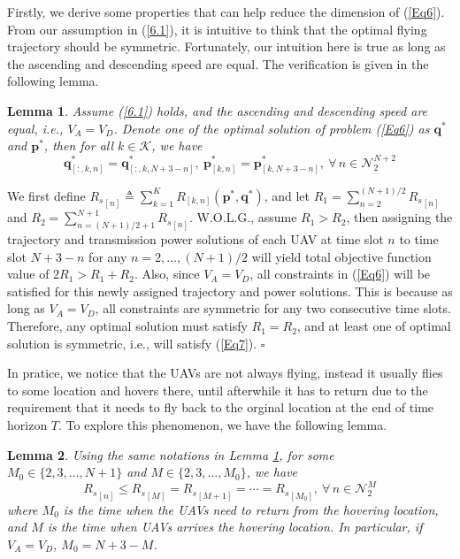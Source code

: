 \documentclass[10pt,final,conference]{IEEEtran}
\newtheorem{lemma}{\textbf{Lemma}}
\renewenvironment{proof}{{\noindent\it Proof.}\quad}{\hfill $\square$\par}
\begin{document}
Firstly, we derive some properties that can help reduce the dimension of (\ref{Eq6}). From our assumption in (\ref{6.1}), it is intuitive to think that the optimal flying trajectory should be symmetric. Fortunately, our intuition here is true as long as the ascending and descending speed are equal. The verification is given in the following lemma.
\begin{lemma}\label{lemma1}
	Assume {\rm (\ref{6.1})} holds, and the ascending and descending speed are equal, i.e., $V_A=V_D$. Denote one of the optimal solution of problem {\rm (\ref{Eq6})} as $\boldsymbol{q}^*$ and $\boldsymbol{p}^*$, then for all $k\in\mathcal{K}$, we have
	\begin{equation}\label{Eq7}
	\boldsymbol{q}^*_{[:,k,n]} = \boldsymbol{q}^*_{[:,k,N+3-n]},\ \boldsymbol{p}^*_{[k,n]} = \boldsymbol{p}^*_{[k,N+3-n]},\ \forall\,n\in\mathcal{N}_2^{N+2}
	\end{equation}
\end{lemma}
\begin{proof}
	We first define ${R_s}_{[n]} \triangleq \sum_{k=1}^K R_{[k,n]}(\boldsymbol{p}^*,\boldsymbol{q}^*)$, and let
	$R_1 = \sum_{n=2}^{(N+1)/2}{R_s}_{[n]}$ and $R_2 = \sum_{n=(N+1)/2+1}^{N+1}{R_s}_{[n]}$.
	W.O.L.G., assume $R_1>R_2$, then assigning the trajectory and transmission power solutions of each UAV at time slot $n$ to time slot $N+3-n$ for any $n=2,\ldots,(N+1)/2$ will yield total objective function value of $2R_1>R_1+R_2$. Also, since $V_A=V_D$, all constraints in (\ref{Eq6}) will be satisfied for this newly assigned trajectory and power solutions. This is because as long as $V_A=V_D$, all constraints are symmetric for any two consecutive time slots. Therefore, any optimal solution must satisfy $R_1=R_2$, and at least one of optimal solution is symmetric, i.e., will satisfy (\ref{Eq7}).
\end{proof}
\baselineskip
In pratice, we notice that the UAVs are not always flying, instead it usually flies to some location and hovers there, until afterwhile it has to return due to the requirement that it needs to fly back to the orginal location at the end of time horizon $T$. To explore this phenomenon, we have the following lemma.
\begin{lemma}\label{lemma2}
	Using the same notations in {\rm Lemma \ref{lemma1}}, for some $M_0\in\{2,3,\ldots,N+1\}$ and $M\in\{2,3,\ldots,M_0\}$, we have
	\begin{equation}\label{Eq8}
	{R_s}_{[n]}\leq {R_s}_{[M]}={R_s}_{[M+1]}=\cdots={R_s}_{[M_0]},\ \forall\,n\in\mathcal{N}_2^M
	\end{equation}
	where $M_0$ is the time when the UAVs need to return from the hovering location, and $M$ is the time when UAVs arrives the hovering location. In particular, if $V_A=V_D$, $M_0=N+3-M$.
\end{lemma}
\end{document}
